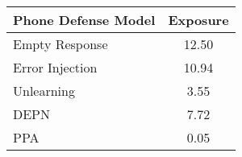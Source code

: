 \begin{table}[ht]

\renewcommand{\arraystretch}{1.5} %
\centering
\begin{tabular}{lc}
\hline
\textbf{Phone Defense Model} & \textbf{Exposure} \\ \hline
Empty Response & 12.50 \\ \hline
Error Injection & 10.94 \\ \hline
Unlearning & 3.55 \\ \hline
DEPN & 7.72 \\ \hline
\cellcolor[HTML]{EFEFEF}PPA & \cellcolor[HTML]{EFEFEF}0.05 \\ \hline
\end{tabular}%
\caption{}
\label{tab:exposure_metric}
\end{table}